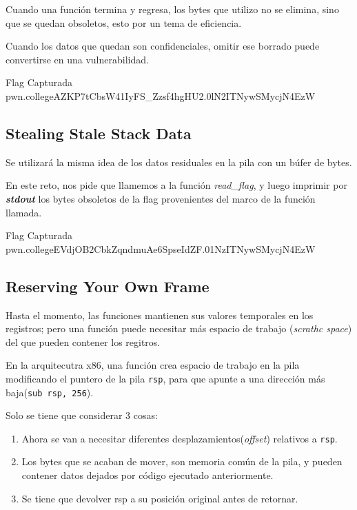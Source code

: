Cuando una función termina y regresa, los bytes que utilizo no se elimina, sino que se
quedan obsoletos, esto por un tema de eficiencia.

Cuando los datos que quedan son confidenciales, omitir ese borrado puede convertirse en una
vulnerabilidad.

\begin{flagbox}{Flag Capturada}
	pwn.college{AZKP7tCbsW41IyFS_Zzsf4hgHU2.0lN2ITNywSMycjN4EzW}
\end{flagbox}

\subsection{Stealing Stale Stack Data}\label{subsec:10-03stealing_stale_stack_data}

Se utilizará la misma idea de los datos residuales en la pila con un búfer de bytes.

En este reto, nos pide que llamemos a la función \textit{read\_flag}, y luego imprimir por
\textbf{\textit{stdout}} los bytes obsoletos de la flag provenientes del marco de la función
llamada.

\begin{flagbox}{Flag Capturada}
	pwn.college{EVdjOB2CbkZqndmuAe6SpseIdZF.01NzITNywSMycjN4EzW}
\end{flagbox}

\subsection{Reserving Your Own Frame}\label{subsec:10-04reserving_your_own_frame}

Hasta el momento, las funciones mantienen sus valores temporales en los registros;
pero una función puede necesitar más espacio de trabajo (\textit{scrathc space})
del que pueden contener los regitros.

En la arquitecutra x86, una función crea espacio de trabajo en la pila modificando
el puntero de la pila \texttt{rsp}, para que apunte a una dirección
más baja(\texttt{sub rsp, 256}).

Solo se tiene que considerar 3 cosas:

\begin{enumerate}
	\item Ahora se van a necesitar diferentes desplazamientos(\textit{offset}) relativos a \texttt{rsp}.
	\item Los bytes que se acaban de mover, son memoria común de la pila, y pueden contener datos dejados por código ejecutado anteriormente.
	\item Se tiene que devolver rsp a su posición original antes de retornar.
\end{enumerate}

